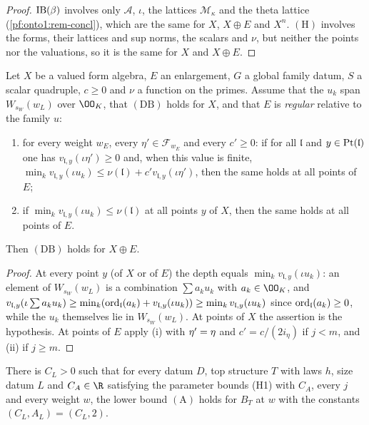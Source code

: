 \begin{proof}
$\mathrm{IB}(\beta)$ involves only $\mathcal A$, $\iota$, the lattices $\mathcal M_\kappa$ and the theta lattice
(\cref{pf:onto1:rem-concl}), which are the same for $X$, $X\oplus E$ and $X^n$. $(\mathrm H)$ involves the forms, their
lattices and sup norms, the scalars and $\nu$, but neither the points nor the valuations, so it is the same for $X$ and
$X\oplus E$.
\end{proof}

\begin{lemma}\label{pf:onto1:combBound_xplus}
Let $X$ be a valued form algebra, $E$ an enlargement, $G$ a global family datum, $S$ a scalar quadruple, $c\ge0$ and
$\nu$ a function on the primes. Assume that the $u_k$ span $W_{s_W}(w_L)$ over $\OO_K$, that $(\mathrm{DB})$ holds for
$X$, and that $E$ is \emph{regular} relative to the family $u$:
\begin{enumerate}[label=(\roman*)]
\item for every weight $w_E$, every $\eta'\in\mathcal F_{w_E}$ and every $c'\ge0$: if for all $\mathfrak l$ and
$y\in\operatorname{Pt}(\mathfrak l)$ one has $v_{\mathfrak l,y}(\iota\eta')\ge0$ and, when this value is finite,
$\min_kv_{\mathfrak l,y}(\iota u_k)\le\nu(\mathfrak l)+c'v_{\mathfrak l,y}(\iota\eta')$, then the same holds at all points of $E$;
\item if $\min_kv_{\mathfrak l,y}(\iota u_k)\le\nu(\mathfrak l)$ at all points $y$ of $X$, then the same holds at all points of $E$.
\end{enumerate}
Then $(\mathrm{DB})$ holds for $X\oplus E$.
\end{lemma}

\begin{proof}
At every point $y$ (of $X$ or of $E$) the depth equals $\min_kv_{\mathfrak l,y}(\iota u_k)$: an element of $W_{s_W}(w_L)$ is
a combination $\sum a_ku_k$ with $a_k\in\OO_K$, and $v_{\mathfrak l,y}(\iota\sum a_ku_k)\ge\min_k(\operatorname{ord}_{\mathfrak
l}(a_k)+v_{\mathfrak l,y}(\iota u_k))\ge\min_kv_{\mathfrak l,y}(\iota u_k)$ since $\operatorname{ord}_{\mathfrak l}(a_k)\ge0$, while the
$u_k$ themselves lie in $W_{s_W}(w_L)$. At points of $X$ the assertion is the hypothesis. At points of $E$ apply (i) with
$\eta'=\eta$ and $c'=c/(2i_\eta)$ if $j<m$, and (ii) if $j\ge m$.
\end{proof}

\begin{lemma}\label{pf:onto1:lamw}
There is $C_L>0$ such that for every datum $D$, top structure $T$ with laws $h$, size datum $L$ and $C_A\in\R$ satisfying
the parameter bounds (H1) with $C_A$, every $j$ and every weight $w$, the lower bound $(\mathrm A)$ holds for $B_T$ at $w$
with the constants $(C_L,A_L)=(C_L,2)$.
\end{lemma}

